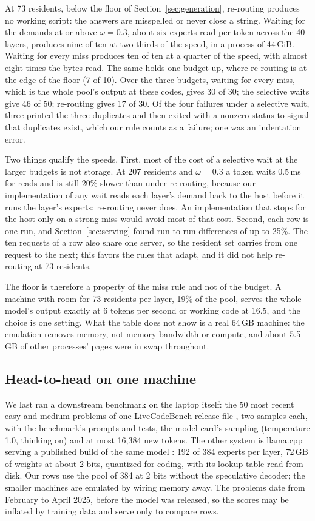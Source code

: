 \documentclass[11pt]{article}
\begin{document}
At 73 residents, below the floor of Section~\ref{sec:generation}, re-routing produces no working
script: the answers are misspelled or never close a string. Waiting for the demands at or above
$\omega=0.3$, about six experts read per token across the 40 layers, produces nine of ten at two thirds of
the speed, in a process of 44\,GiB. Waiting for every miss produces ten of ten at a quarter of the
speed, with almost eight times the bytes read. The same holds one budget up, where re-routing is at the
edge of the floor (7 of 10). Over the three budgets, waiting for every miss, which is the whole pool's output at these
codes, gives 30 of 30; the selective waits give 46 of 50; re-routing
gives 17 of 30. Of the four failures under a selective wait, three printed the three duplicates
and then exited with a nonzero status to signal that duplicates exist, which our rule counts as a
failure; one was an indentation error.

Two things qualify the speeds. First, most of the cost of a selective wait at the larger budgets
is not storage. At 207 residents and $\omega=0.3$ a token waits 0.5\,ms for reads and is still
20\% slower than under re-routing, because our implementation of any wait reads each layer's
demand back to the host before it runs the layer's experts; re-routing never does. An implementation that stops for the host only on a strong miss would avoid most of that cost. Second, each row
is one run, and Section~\ref{sec:serving} found run-to-run differences of up to 25\%. The ten
requests of a row also share one server, so the resident set carries from one request to the next;
this favors the rules that adapt, and it did not help re-routing at 73 residents.

The floor is therefore a property of the miss rule and not of the budget. A machine with room
for 73 residents per layer, 19\% of the pool, serves the whole model's output exactly at 6 tokens
per second or working code at 16.5, and the choice is one setting. What the table does not show is
a real 64\,GB machine: the emulation removes memory, not memory bandwidth or compute, and about
5.5\,GB of other processes' pages were in swap throughout.

\subsection{Head-to-head on one machine}
\label{sec:headtohead}

We last ran a downstream benchmark on the laptop itself: the 50 most recent easy and medium problems of one LiveCodeBench release file \citep{jain2024livecodebench}, two samples each, with the benchmark's prompts and tests, the model card's sampling (temperature 1.0, thinking on) and at most 16{,}384 new tokens. The other system is llama.cpp serving a published build of the same model \citep{daslab2026coder}: 192 of 384 experts per layer, 72\,GB of weights at about 2 bits, quantized for coding, with its lookup table read from disk. Our rows use the pool of 384 at 2 bits without the speculative decoder; the smaller machines are emulated by wiring memory away. The problems date from February to April 2025, before the model was released, so the scores may be inflated by training data and serve only to compare rows.
\end{document}
